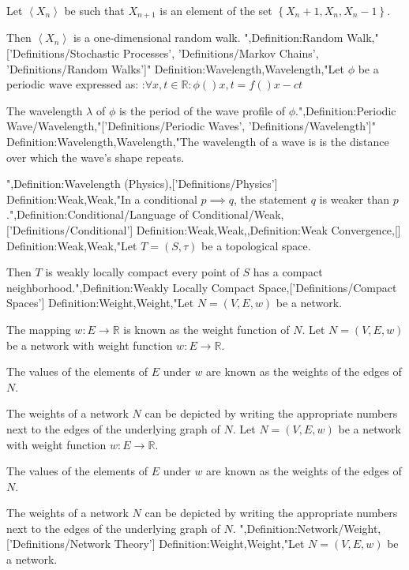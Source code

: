 Let $\left\langle X_n \right\rangle$ be such that $X_{n + 1}$ is an element of the set $\left\lbrace X_n + 1, X_n, X_n - 1 \right\rbrace$.

Then $\left\langle X_n \right\rangle$ is a one-dimensional random walk.
",Definition:Random Walk,"['Definitions/Stochastic Processes', 'Definitions/Markov Chains', 'Definitions/Random Walks']"
Definition:Wavelength,Wavelength,"Let $\phi$ be a periodic wave expressed as:
:$\forall x, t \in \mathbb R: \phi \left(   \right){x, t} = f \left(   \right){x - c t}$


The wavelength $\lambda$ of $\phi$ is the period of the wave profile of $\phi$.",Definition:Periodic Wave/Wavelength,"['Definitions/Periodic Waves', 'Definitions/Wavelength']"
Definition:Wavelength,Wavelength,"The wavelength of a wave is is the distance over which the wave's shape repeats.


",Definition:Wavelength (Physics),['Definitions/Physics']
Definition:Weak,Weak,"In a conditional $p \implies q$, the statement $q$ is weaker than $p$.",Definition:Conditional/Language of Conditional/Weak,['Definitions/Conditional']
Definition:Weak,Weak,,Definition:Weak Convergence,[]
Definition:Weak,Weak,"Let $T = \left( S, \tau \right)$ be a topological space.


Then $T$ is weakly locally compact  every point of $S$ has a compact neighborhood.",Definition:Weakly Locally Compact Space,['Definitions/Compact Spaces']
Definition:Weight,Weight,"Let $N = \left({V, E, w}\right)$ be a network.

The mapping $w: E \to \mathbb R$ is known as the weight function of $N$.
Let $N = \left( V, E, w \right)$ be a network with weight function $w: E \to \mathbb R$.


The values of the elements of $E$ under $w$ are known as the weights of the edges of $N$.


The weights of a network $N$ can be depicted by writing the appropriate numbers next to the edges of the underlying graph of $N$.
Let $N = \left( V, E, w \right)$ be a network with weight function $w: E \to \mathbb R$.


The values of the elements of $E$ under $w$ are known as the weights of the edges of $N$.


The weights of a network $N$ can be depicted by writing the appropriate numbers next to the edges of the underlying graph of $N$.
",Definition:Network/Weight,['Definitions/Network Theory']
Definition:Weight,Weight,"Let $N = \left({V, E, w}\right)$ be a network.

